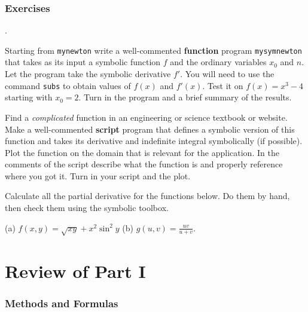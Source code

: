 \subsection*{Exercises}
\begin{list}
{.}{}

\item Starting from \verb&mynewton& write a well-commented {\bf
    function} program \verb&mysymnewton& that takes as its input a
  symbolic function $f$ and the ordinary variables $x_0$ and $n$.  Let
  the program take the symbolic derivative $f'$. You will need to use the command
  \verb&subs& to obtain values of $f(x)$ and $f'(x)$. Test it on $f(x)=x^3-4$
  starting with $x_0=2$.  Turn in the program and a brief summary of
  the results.
  
  
\item Find a {\em complicated} function in an engineering or science
  textbook or website.  Make a well-commented {\bf script} program that defines 
  a symbolic version of this function and takes its derivative and
  indefinite integral symbolically (if possible). Plot the function on the domain that is relevant
  for the application. In the comments of the script
  describe what the function is and properly reference where you got
  it. Turn in your script and the plot.


\item Calculate all the partial derivative for the functions below. 
Do them by hand, then check them using the symbolic toolbox.

\hspace*{1cm} (a)  ${\displaystyle f(x,y) = \sqrt{xy} + x^2 \sin^2{y} }$   \qquad  \qquad  (b)  ${\displaystyle g(u,v) = \frac{uv}{u+v}}$.

\end{list}



\chapter*{Review of Part I}




\subsection*{Methods and Formulas}

